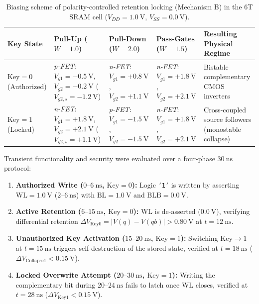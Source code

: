 \documentclass[conference]{IEEEtran}
\begin{document}
\begin{table}[t]
\centering
\caption{Biasing scheme of polarity-controlled retention locking (Mechanism B) in the 6T SRAM cell ($V_{DD}=1.0\ \text{V}$, $V_{SS}=0.0\ \text{V}$).}
\label{tab:sram_biases}
\footnotesize
\setlength{\tabcolsep}{4.5pt}
\begin{tabularx}{\textwidth}{>{\raggedright\arraybackslash}p{2.1cm} >{\raggedright\arraybackslash}p{3.5cm} >{\raggedright\arraybackslash}p{3.0cm} >{\raggedright\arraybackslash}p{3.0cm} >{\raggedright\arraybackslash}X}
\toprule
\textbf{Key State} & \textbf{Pull-Up ($W=1.0$)} & \textbf{Pull-Down ($W=2.0$)} & \textbf{Pass-Gates ($W=1.5$)} & \textbf{Resulting Physical Regime} \\
\midrule
$\text{Key}=0$ (Authorized) & \textit{p-FET}: $V_{g1}=-0.5\ \text{V}$, $V_{g2}=-0.2\ \text{V}$ ($V_{g2,s}=-1.2\ \text{V}$) & \textit{n-FET}: $V_{g1}=+0.8\ \text{V}$, $V_{g2}=+1.1\ \text{V}$ & \textit{n-FET}: $V_{g1}=+1.8\ \text{V}$, $V_{g2}=+2.1\ \text{V}$ & Bistable complementary CMOS inverters \\
\addlinespace[3pt]
$\text{Key}=1$ (Locked) & \textit{n-FET}: $V_{g1}=+1.8\ \text{V}$, $V_{g2}=+2.1\ \text{V}$ ($V_{g2,s}=+1.1\ \text{V}$) & \textit{p-FET}: $V_{g1}=-1.5\ \text{V}$, $V_{g2}=-1.5\ \text{V}$ & \textit{n-FET}: $V_{g1}=+1.8\ \text{V}$, $V_{g2}=+2.1\ \text{V}$ & Cross-coupled source followers (monostable collapse) \\
\bottomrule
\end{tabularx}
\end{table}

Transient functionality and security were evaluated over a four-phase $30\ \text{ns}$ protocol:
\begin{enumerate}
    \item \textbf{Authorized Write ($0\text{--}6\ \text{ns}$, $\text{Key}=0$):} Logic \texttt{'1'} is written by asserting $\mathrm{WL} = 1.0\ \text{V}$ ($2\text{--}6\ \text{ns}$) with $\mathrm{BL} = 1.0\ \text{V}$ and $\mathrm{BLB} = 0.0\ \text{V}$.
    \item \textbf{Active Retention ($6\text{--}15\ \text{ns}$, $\text{Key}=0$):} $\mathrm{WL}$ is de-asserted ($0.0\ \text{V}$), verifying differential retention $\Delta V_{\mathrm{Key0}} = |V(q)-V(qb)| > 0.80\ \text{V}$ at $t = 12\ \text{ns}$.
    \item \textbf{Unauthorized Key Activation ($15\text{--}20\ \text{ns}$, $\text{Key}=1$):} Switching $\text{Key} \to 1$ at $t = 15\ \text{ns}$ triggers self-destruction of the stored state, verified at $t = 18\ \text{ns}$ ($\Delta V_{\mathrm{Collapse1}} < 0.15\ \text{V}$).
    \item \textbf{Locked Overwrite Attempt ($20\text{--}30\ \text{ns}$, $\text{Key}=1$):} Writing the complementary bit during $20\text{--}24\ \text{ns}$ fails to latch once $\mathrm{WL}$ closes, verified at $t = 28\ \text{ns}$ ($\Delta V_{\mathrm{Key1}} < 0.15\ \text{V}$).
\end{enumerate}
\end{document}
